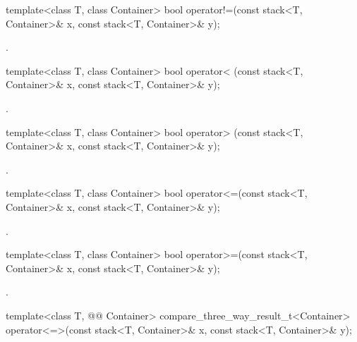 %
\begin{itemdecl}
template<class T, class Container>
  bool operator!=(const stack<T, Container>& x, const stack<T, Container>& y);
\end{itemdecl}

\begin{itemdescr}
\pnum
\returns
{}.
\end{itemdescr}

%
\begin{itemdecl}
template<class T, class Container>
  bool operator< (const stack<T, Container>& x, const stack<T, Container>& y);
\end{itemdecl}

\begin{itemdescr}
\pnum
\returns
{}.
\end{itemdescr}

%
\begin{itemdecl}
template<class T, class Container>
  bool operator> (const stack<T, Container>& x, const stack<T, Container>& y);
\end{itemdecl}

\begin{itemdescr}
\pnum
\returns
{}.
\end{itemdescr}

%
\begin{itemdecl}
template<class T, class Container>
  bool operator<=(const stack<T, Container>& x, const stack<T, Container>& y);
\end{itemdecl}

\begin{itemdescr}
\pnum
\returns
{}.
\end{itemdescr}

%
\begin{itemdecl}
template<class T, class Container>
  bool operator>=(const stack<T, Container>& x, const stack<T, Container>& y);
\end{itemdecl}

\begin{itemdescr}
\pnum
\returns
{}.
\end{itemdescr}

%
\begin{itemdecl}
template<class T, @@ Container>
  compare_three_way_result_t<Container>
    operator<=>(const stack<T, Container>& x, const stack<T, Container>& y);
\end{itemdecl}

